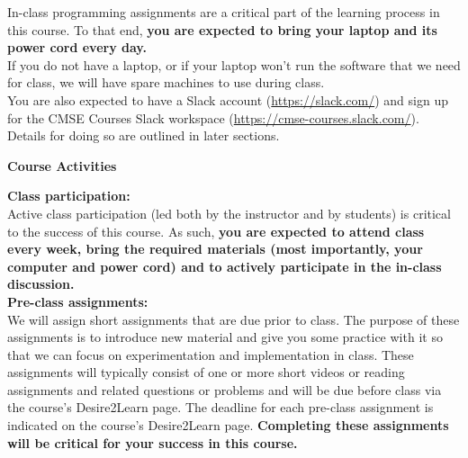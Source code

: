 \documentclass[oneside,letterpaper,11pt]{exam}
\begin{document}
{\noindent In-class programming assignments are a critical part of the learning process in this course. To that end, \textbf{you are expected to bring your laptop and its power cord every day.}}\\

{\noindent If you do not have a laptop, or if your laptop won't run the software that we need for class, we will have spare machines to use during class.}\\

{\noindent You are also expected to have a Slack account (\url{https://slack.com/}) and sign up for the CMSE Courses Slack workspace (\url{https://cmse-courses.slack.com/}). Details for doing so are outlined in later sections.}


\begin{center}
	\vspace{5pt}
	\textbf{Course Activities}
	\vspace{5pt}
\end{center}

{\noindent \textbf{Class participation:}}\\[-5pt]

{\noindent Active class participation (led both by the instructor and by students) is critical to the success of this course. As such, \textbf{you are expected to attend class every week, bring the required materials (most importantly, your computer and power cord) and to actively participate in the in-class discussion.}}\\

\newpage
{\noindent \textbf{Pre-class assignments:}}\\[-5pt]

{\noindent We will assign short assignments that are due prior to class. The purpose of these assignments is to introduce new material and give you some practice with it so that we can focus on experimentation and implementation in class. These assignments will typically consist of one or more short videos or reading assignments and related questions or problems and will be due before class via the course's Desire2Learn page. The deadline for each pre-class assignment is indicated on the course's Desire2Learn page. \textbf{Completing these assignments will be critical for your success in this course.}}\\
\end{document}
